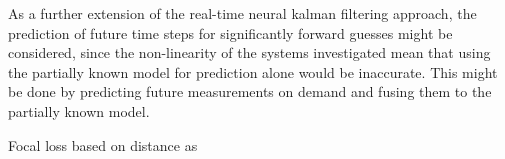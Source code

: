 \documentclass[a4paper,twoside,12pt]{report}
\begin{document}
As a further extension of the real-time neural kalman filtering approach, the prediction of future time steps for significantly forward guesses might be considered, since the non-linearity of the systems investigated mean that using the partially known model for prediction alone would be inaccurate. This might be done by predicting future measurements on demand and fusing them to the partially known model.


Focal loss based on distance as

%



\end{document}
